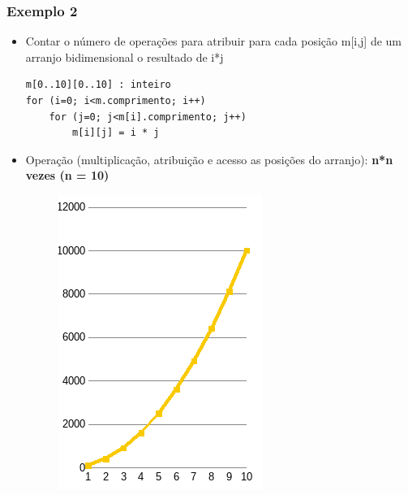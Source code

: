 \documentclass[aspectratio=169]{beamer}
\begin{document}
\begin{frame}[fragile]\frametitle{Exemplo 2}
\begin{itemize}
	\item Contar o número de operações para atribuir para cada posição m[i,j] de um arranjo bidimensional o resultado de i*j
\begin{verbatim}
m[0..10][0..10] : inteiro
for (i=0; i<m.comprimento; i++)
    for (j=0; j<m[i].comprimento; j++)
        m[i][j] = i * j
\end{verbatim}
	\pause
	\item Operação (multiplicação, atribuição e acesso as posições do arranjo): \textbf{n*n vezes (n = 10)}
	\pause
	\begin{figure}[h]
		\centering
		\includegraphics[height=0.35\paperheight]{pucrs-ec-poo-unidade_01-complexidade_de_algoritmos-laminas-grafico3.png}
	\end{figure}
\end{itemize}
\end{frame}
\end{document}
